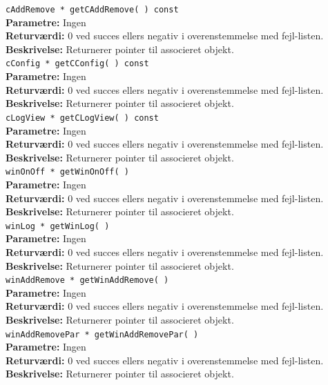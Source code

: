 \verb+cAddRemove * getCAddRemove( ) const+\\
\textbf{Parametre:} Ingen \\
\textbf{Returværdi:} 0 ved succes ellers negativ i overenstemmelse med fejl-listen. \\
\textbf{Beskrivelse:} Returnerer pointer til associeret objekt.\\

\verb+cConfig * getCConfig( ) const+\\
\textbf{Parametre:} Ingen \\
\textbf{Returværdi:} 0 ved succes ellers negativ i overenstemmelse med fejl-listen. \\
\textbf{Beskrivelse:} Returnerer pointer til associeret objekt.\\

\verb+cLogView * getCLogView( ) const+\\
\textbf{Parametre:} Ingen \\
\textbf{Returværdi:} 0 ved succes ellers negativ i overenstemmelse med fejl-listen. \\
\textbf{Beskrivelse:} Returnerer pointer til associeret objekt.\\

\verb+winOnOff * getWinOnOff( )+\\
\textbf{Parametre:} Ingen \\
\textbf{Returværdi:} 0 ved succes ellers negativ i overenstemmelse med fejl-listen. \\
\textbf{Beskrivelse:} Returnerer pointer til associeret objekt.\\

\verb+winLog * getWinLog( )+\\
\textbf{Parametre:} Ingen \\
\textbf{Returværdi:} 0 ved succes ellers negativ i overenstemmelse med fejl-listen. \\
\textbf{Beskrivelse:} Returnerer pointer til associeret objekt.\\

\verb+winAddRemove * getWinAddRemove( )+\\
\textbf{Parametre:} Ingen \\
\textbf{Returværdi:} 0 ved succes ellers negativ i overenstemmelse med fejl-listen. \\
\textbf{Beskrivelse:} Returnerer pointer til associeret objekt.\\

\verb+winAddRemovePar * getWinAddRemovePar( )+\\
\textbf{Parametre:} Ingen \\
\textbf{Returværdi:} 0 ved succes ellers negativ i overenstemmelse med fejl-listen. \\
\textbf{Beskrivelse:} Returnerer pointer til associeret objekt.\\

